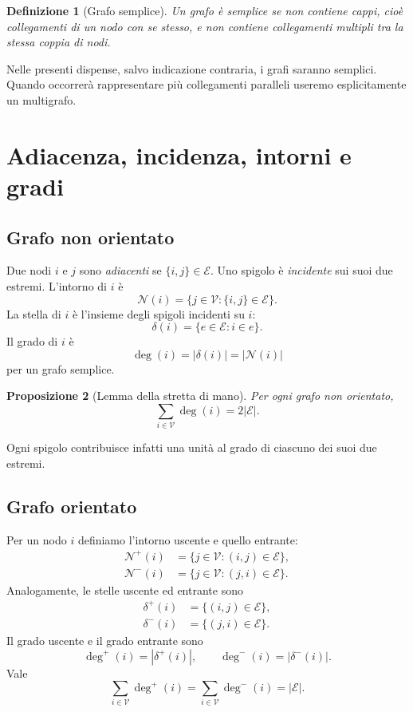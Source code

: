 \documentclass[11pt,a4paper]{article}
\newtheorem{definition}{Definizione}[section]
\newtheorem{proposition}[definition]{Proposizione}
\newcommand{\V}{\mathcal{V}}
\newcommand{\E}{\mathcal{E}}
\newcommand{\N}{\mathcal{N}}
\newcommand{\deltaout}{\delta^{+}}
\newcommand{\deltain}{\delta^{-}}
\begin{document}
\begin{definition}[Grafo semplice]
Un grafo è semplice se non contiene cappi, cioè collegamenti di un nodo con se stesso, e non contiene collegamenti multipli tra la stessa coppia di nodi.
\end{definition}

Nelle presenti dispense, salvo indicazione contraria, i grafi saranno semplici. Quando occorrerà rappresentare più collegamenti paralleli useremo esplicitamente un multigrafo.

\section{Adiacenza, incidenza, intorni e gradi}

\subsection{Grafo non orientato}

Due nodi $i$ e $j$ sono \emph{adiacenti} se $\{i,j\}\in\E$. Uno spigolo è \emph{incidente} sui suoi due estremi. L'intorno di $i$ è
\[
\N(i)=\{j\in\V:\{i,j\}\in\E\}.
\]
La stella di $i$ è l'insieme degli spigoli incidenti su $i$:
\[
\delta(i)=\{e\in\E:i\in e\}.
\]
Il grado di $i$ è
\[
\deg(i)=|\delta(i)|=|\N(i)|
\]
per un grafo semplice.

\begin{proposition}[Lemma della stretta di mano]
Per ogni grafo non orientato,
\[
\sum_{i\in\V}\deg(i)=2|\E|.
\]
\end{proposition}
Ogni spigolo contribuisce infatti una unità al grado di ciascuno dei suoi due estremi.

\subsection{Grafo orientato}

Per un nodo $i$ definiamo l'intorno uscente e quello entrante:
\begin{align*}
\N^+(i)&=\{j\in\V:(i,j)\in\E\},\\
\N^-(i)&=\{j\in\V:(j,i)\in\E\}.
\end{align*}
Analogamente, le stelle uscente ed entrante sono
\begin{align*}
\deltaout(i)&=\{(i,j)\in\E\},\\
\deltain(i)&=\{(j,i)\in\E\}.
\end{align*}
Il grado uscente e il grado entrante sono
\[
\deg^+(i)=|\deltaout(i)|,
\qquad
\deg^-(i)=|\deltain(i)|.
\]
Vale
\[
\sum_{i\in\V}\deg^+(i)=\sum_{i\in\V}\deg^-(i)=|\E|.
\]
\end{document}
